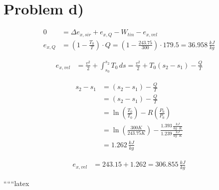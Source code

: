\section*{Problem d)}

\begin{align*}
0 &= \Delta e_{x,sir} + e_{x,Q} - W_{tin} - e_{x,vel} \\
e_{x,Q} &= \left( 1 - \frac{T_0}{T} \right) \cdot Q = \left( 1 - \frac{243.75}{300} \right) \cdot 179.5 = 36.958 \, \frac{kJ}{kg}
\end{align*}

\begin{align*}
e_{x,vel} &= \frac{v^2}{2} + \int_{s_0}^{s_2} T_0 \, ds = \frac{v^2}{2} + T_0 \left( s_2 - s_1 \right) - \frac{Q}{T}
\end{align*}

\begin{align*}
s_2 - s_1 &= \left( s_2 - s_1 \right) - \frac{Q}{T} \\
&= \left( s_2 - s_1 \right) - \frac{Q}{T} \\
&= \ln \left( \frac{T_0}{T_0} \right) - R \left( \frac{P_0}{P_0} \right) \\
&= \ln \left( \frac{300 K}{243.75 K} \right) - \frac{1.393 \, \frac{kJ}{kg \cdot K}}{1.239 \, \frac{kJ}{kg \cdot K}} \\
&= 1.262 \, \frac{kJ}{kg}
\end{align*}

\begin{align*}
e_{x,vel} &= 243.15 + 1.262 = 306.855 \, \frac{kJ}{kg}
\end{align*}

``````latex